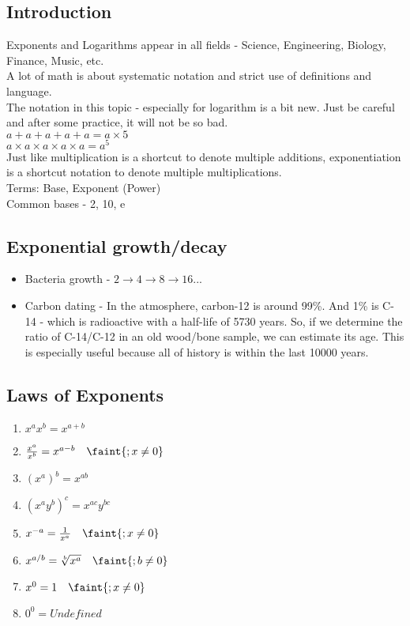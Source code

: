 \documentclass{hw}
\begin{document}
\subsection*{\normalsize Introduction}
Exponents and Logarithms appear in all fields - Science, Engineering, Biology, Finance, Music, etc. \\

A lot of math is about systematic notation and strict use of definitions and language.\\
The notation in this topic - especially for logarithm is a bit new. Just be careful and after some practice, it will not be so bad.\\

$a + a + a + a + a = a \times 5$ \\
$a \times a \times a \times a \times a = a^5$ \\

Just like multiplication is a shortcut to denote multiple additions, exponentiation is a shortcut notation to denote multiple multiplications.\\

Terms: Base, Exponent (Power) \\
Common bases - 2, 10, e

\subsection*{\normalsize Exponential growth/decay}
\begin{itemize}
\item Bacteria growth - $2 \rightarrow 4 \rightarrow 8 \rightarrow 16 ...$
\item Carbon dating - In the atmosphere, carbon-12 is around 99\%. And 1\% is C-14 - which is radioactive with a half-life of 5730 years.
So, if we determine the ratio of C-14/C-12 in an old wood/bone sample, we can estimate its age.
This is especially useful because all of history is within the last 10000 years.
\end{itemize}

\subsection*{\normalsize Laws of Exponents}
\begin{enumerate}[label=\roman*)]
\item $x^ax^b = x^{a+b}$
\item $\frac{x^a}{x^b} = x^{a-b} \quad \faint{; x \neq 0}$
\item $(x^a)^b = x^{ab}$
\item $(x^a y^b)^c = x^{ac} y^{bc}$
\item $x^{-a} = \frac{1}{x^a} \quad \faint{; x \neq 0}$
\item $x^{a/b} = \sqrt[b]{x^a} \quad \faint{; b \neq 0}$
\item $x^0 = 1 \quad \faint{; x \neq 0}$
\item $0^0 = Undefined$
\end{enumerate}
\end{document}

